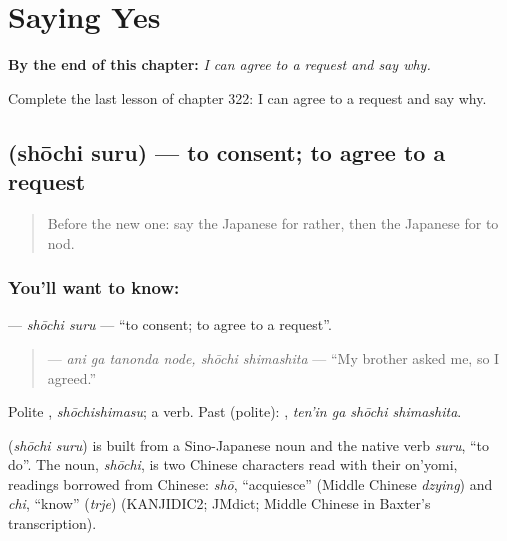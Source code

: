 
\chapter{Saying Yes}
\label{ch:ja-saying-yes}

\begin{chapteropening}
\textbf{By the end of this chapter:} \emph{I can agree to a request and say why.}

Complete the last lesson of chapter 322: I can agree to a request and say why.
\end{chapteropening}

\section[\texorpdfstring{\ja{しょうちする} (shōchi suru)}{しょうちする (shōchi suru)}]{ (shōchi suru) — to consent; to agree to a request}

\label{lesson:JA-C322-shouchi-suru}



\begin{quote}
Before the new one: say the Japanese for rather, then the Japanese for to nod.
\end{quote}

\subsection*{You'll want to know: }
\textbf{} — \emph{shōchi suru} — \textquotedblleft{}to consent; to agree to a request\textquotedblright{}.

\begin{quote}
\textbf{ } — \emph{ani ga tanonda node, shōchi shimashita} — \textquotedblleft{}My brother asked me, so I agreed.\textquotedblright{}
\end{quote}

Polite \textbf{}, \emph{shōchishimasu}; a  verb. Past (polite): \textbf{ }, \emph{ten'in ga shōchi shimashita}.

\begin{cousinweb}
\textbf{} (\emph{shōchi suru}) is built from a Sino-Japanese noun and the native verb \emph{suru}, \textquotedblleft{}to do\textquotedblright{}. The noun, \emph{shōchi}, is two Chinese characters read with their on'yomi, readings borrowed from Chinese: \emph{shō}, \textquotedblleft{}acquiesce\textquotedblright{} (Middle Chinese \emph{dzying}) and \emph{chi}, \textquotedblleft{}know\textquotedblright{} (\emph{trje}) (KANJIDIC2; JMdict; Middle Chinese in Baxter's transcription).
\end{cousinweb}

